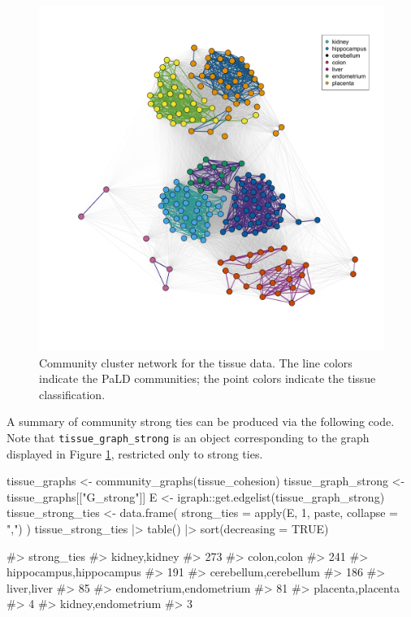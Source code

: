 \begin{Schunk}
\begin{figure}
\includegraphics[width=1\linewidth]{fig5} \caption[Community cluster network for the tissue data]{Community cluster network for the tissue data. The line colors indicate the PaLD communities; the point colors indicate the tissue classification.}\label{fig:fig4}
\end{figure}
\end{Schunk}

A summary of community strong ties can be produced via the following
code. Note that \texttt{tissue\_graph\_strong} is an 
object corresponding to the graph displayed in Figure \ref{fig:fig4},
restricted only to strong ties.

\begin{Schunk}
\begin{Sinput}
tissue_graphs <- community_graphs(tissue_cohesion)
tissue_graph_strong <- tissue_graphs[["G_strong"]]
E <- igraph::get.edgelist(tissue_graph_strong)
tissue_strong_ties <- data.frame(
  strong_ties = apply(E, 1, paste, collapse = ",")
)
tissue_strong_ties |>
  table() |>
  sort(decreasing = TRUE)
\end{Sinput}
\begin{Soutput}
#> strong_ties
#>           kidney,kidney 
#>                     273 
#>             colon,colon 
#>                     241 
#> hippocampus,hippocampus 
#>                     191 
#>   cerebellum,cerebellum 
#>                     186 
#>             liver,liver 
#>                      85 
#> endometrium,endometrium 
#>                      81 
#>       placenta,placenta 
#>                       4 
#>      kidney,endometrium 
#>                       3
\end{Soutput}
\end{Schunk}


